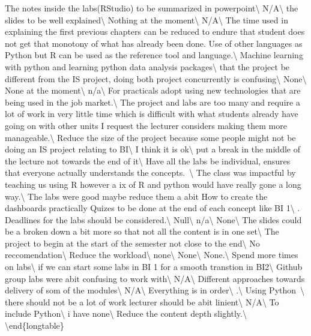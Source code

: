 \documentclass[
]{article}
\begin{document}
{\hline The notes inside the labs(RStudio) to be summarized in
powerpoint\textbackslash{} \hline N/A\textbackslash{} \hline the slides
to be well explained\textbackslash{} \hline Nothing at the
moment\textbackslash{} \hline N/A\textbackslash{} \hline The time used
in explaining the first previous chapters can be reduced to endure that
student does not get that monotony of what has already been done. Use of
other languages as Python but R can be used as the reference tool and
language.\textbackslash{} \hline Machine learning with python and
learning python data analysis packages\textbackslash{} \hline that the
project be different from the IS project, doing both project
concurrently is confusing\textbackslash{} \hline None\textbackslash{}
\hline None at the moment\textbackslash{} \hline n/a\textbackslash{}
\hline For practicals adopt using new technologies that are being used
in the job market.\textbackslash{} \hline The project and labs are too
many and require a lot of work in very little time which is difficult
with what students already have going on with other units I request the
lecturer considers making them more manageable.\textbackslash{} \hline
Reduce the size of the project because some people might not be doing an
IS project relating to BI\textbackslash{} \hline I think it is
ok\textbackslash{} \hline put a break in the middle of the lecture not
towards the end of it\textbackslash{} \hline Have all the labs be
individual, ensures that everyone actually understands the
concepts.~\textbackslash{} \hline The class was impactful by teaching us
using R however a ix of R and python would have really gone a long
way.\textbackslash{} \hline The labs were good maybe reduce them a abit
How to create the dashboards practically Quizes to be done at the end of
each concept like BI 1\textbackslash{} . Deadlines for the labs should be considered.\textbackslash{} \hline
Null\textbackslash{} \hline n/a\textbackslash{} \hline
None\textbackslash{} \hline The slides could be a broken down a bit more
so that not all the content is in one set\textbackslash{} \hline The
project to begin at the start of the semester not close to the
end\textbackslash{} \hline No reccomendation\textbackslash{} \hline
Reduce the workload\textbackslash{} \hline none\textbackslash{} \hline
None\textbackslash{} \hline None.\textbackslash{} \hline }Spend more
times on labs\textbackslash{} \hline if we can start some labs in BI 1
for a smooth transtion in BI2\textbackslash{} \hline Github group labs
were abit confusing to work with\textbackslash{} \hline
N/A\textbackslash{} \hline Different approaches towards delivery of som
of the modules\textbackslash{} \hline N/A\textbackslash{} \hline
Everything is in order\textbackslash{} \hline .\textbackslash{} \hline
Using Python~\textbackslash{} \hline there should not be a lot of work
lecturer should be abit linient\textbackslash{} \hline
N/A\textbackslash{} \hline To include Python\textbackslash{} \hline i
have none\textbackslash{} \hline Reduce the content depth
slightly.\textbackslash{} \bottomrule \textbackslash end\{longtable\}
\end{document}

